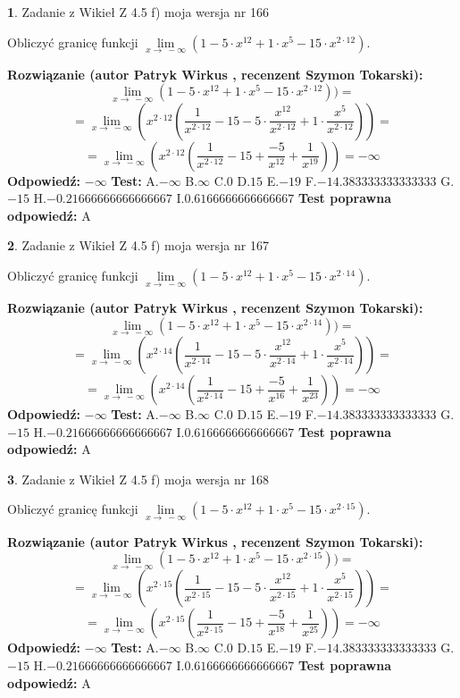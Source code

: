 \documentclass[12pt, a4paper]{article}
\theoremstyle{definition} %
\newtheorem{zad}{}
\newcommand{\zadStart}[1]{\begin{zad}#1\newline}
\newcommand{\zadStop}{\end{zad}}
\newcommand{\rozwStart}[2]{\noindent \textbf{Rozwiązanie (autor #1 , recenzent #2): }\newline}
\newcommand{\rozwStop}{\newline}
\newcommand{\odpStart}{\noindent \textbf{Odpowiedź:}\newline}
\newcommand{\odpStop}{\newline}
\newcommand{\testStart}{\noindent \textbf{Test:}\newline}
\newcommand{\testStop}{\newline}
\newcommand{\kluczStart}{\noindent \textbf{Test poprawna odpowiedź:}\newline}
\newcommand{\kluczStop}{\newline}
\begin{document}
\zadStart{Zadanie z Wikieł Z 4.5 f) moja wersja nr 166}


Obliczyć granicę funkcji  $\lim\limits_{x\to\ -\infty}(1 - 5 \cdot x^{12}+1 \cdot x^{5}- 15 \cdot x^{2\cdot12})$.
\zadStop
\rozwStart{Patryk Wirkus}{Szymon Tokarski}
$$\lim\limits_{x\to\ -\infty}(1 - 5 \cdot x^{12}+1 \cdot x^{5}- 15 \cdot x^{2\cdot12}))=$$
$$=\lim\limits_{x\to\ -\infty}(x^{2\cdot12}(\frac{1}{x^{2\cdot12}}-15 -5 \cdot \frac{x^{12}}{x^{2\cdot12}}+1 \cdot \frac{x^{5}}{x^{2\cdot12}}))=$$
$$=\lim\limits_{x\to\ -\infty}(x^{2\cdot12}(\frac{1}{x^{2\cdot12}}-15 + \frac{-5}{x^{12}}+ \frac{1}{x^{19}}))=-\infty$$
\rozwStop
\odpStart
$-\infty$
\odpStop
\testStart
A.$-\infty$ B.$\infty$ C.$0$ D.$15$ E.$-19$
F.$-14.383333333333333$ G.$-15$
H.$-0.21666666666666667$
I.$0.6166666666666667$
\testStop
\kluczStart
A
\kluczStop



\zadStart{Zadanie z Wikieł Z 4.5 f) moja wersja nr 167}


Obliczyć granicę funkcji  $\lim\limits_{x\to\ -\infty}(1 - 5 \cdot x^{12}+1 \cdot x^{5}- 15 \cdot x^{2\cdot14})$.
\zadStop
\rozwStart{Patryk Wirkus}{Szymon Tokarski}
$$\lim\limits_{x\to\ -\infty}(1 - 5 \cdot x^{12}+1 \cdot x^{5}- 15 \cdot x^{2\cdot14}))=$$
$$=\lim\limits_{x\to\ -\infty}(x^{2\cdot14}(\frac{1}{x^{2\cdot14}}-15 -5 \cdot \frac{x^{12}}{x^{2\cdot14}}+1 \cdot \frac{x^{5}}{x^{2\cdot14}}))=$$
$$=\lim\limits_{x\to\ -\infty}(x^{2\cdot14}(\frac{1}{x^{2\cdot14}}-15 + \frac{-5}{x^{16}}+ \frac{1}{x^{23}}))=-\infty$$
\rozwStop
\odpStart
$-\infty$
\odpStop
\testStart
A.$-\infty$ B.$\infty$ C.$0$ D.$15$ E.$-19$
F.$-14.383333333333333$ G.$-15$
H.$-0.21666666666666667$
I.$0.6166666666666667$
\testStop
\kluczStart
A
\kluczStop



\zadStart{Zadanie z Wikieł Z 4.5 f) moja wersja nr 168}


Obliczyć granicę funkcji  $\lim\limits_{x\to\ -\infty}(1 - 5 \cdot x^{12}+1 \cdot x^{5}- 15 \cdot x^{2\cdot15})$.
\zadStop
\rozwStart{Patryk Wirkus}{Szymon Tokarski}
$$\lim\limits_{x\to\ -\infty}(1 - 5 \cdot x^{12}+1 \cdot x^{5}- 15 \cdot x^{2\cdot15}))=$$
$$=\lim\limits_{x\to\ -\infty}(x^{2\cdot15}(\frac{1}{x^{2\cdot15}}-15 -5 \cdot \frac{x^{12}}{x^{2\cdot15}}+1 \cdot \frac{x^{5}}{x^{2\cdot15}}))=$$
$$=\lim\limits_{x\to\ -\infty}(x^{2\cdot15}(\frac{1}{x^{2\cdot15}}-15 + \frac{-5}{x^{18}}+ \frac{1}{x^{25}}))=-\infty$$
\rozwStop
\odpStart
$-\infty$
\odpStop
\testStart
A.$-\infty$ B.$\infty$ C.$0$ D.$15$ E.$-19$
F.$-14.383333333333333$ G.$-15$
H.$-0.21666666666666667$
I.$0.6166666666666667$
\testStop
\kluczStart
A
\kluczStop
\end{document}
